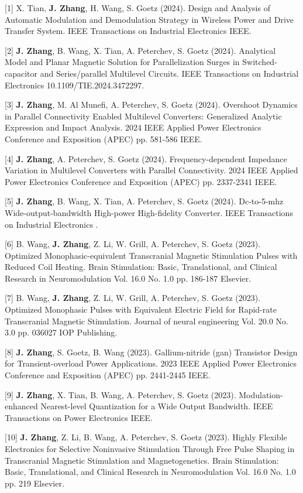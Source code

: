 [1] X. Tian, \textbf{J. Zhang}, H. Wang, S. Goetz (2024). Design and Analysis of Automatic Modulation and Demodulation Strategy in Wireless Power and Drive Transfer System. IEEE Transactions on Industrial Electronics    IEEE.

[2] \textbf{J. Zhang}, B. Wang, X. Tian, A. Peterchev, S. Goetz (2024). Analytical Model and Planar Magnetic Solution for Parallelization Surges in Switched-capacitor and Series/parallel Multilevel Circuits. IEEE Transactions on Industrial Electronics    10.1109/TIE.2024.3472297.

[3] \textbf{J. Zhang}, M. Al Munefi, A. Peterchev, S. Goetz (2024). Overshoot Dynamics in Parallel Connectivity Enabled Multilevel Converters: Generalized Analytic Expression and Impact Analysis. 2024 IEEE Applied Power Electronics Conference and Exposition (APEC)   pp. 581-586 IEEE.

[4] \textbf{J. Zhang}, A. Peterchev, S. Goetz (2024). Frequency-dependent Impedance Variation in Multilevel Converters with Parallel Connectivity. 2024 IEEE Applied Power Electronics Conference and Exposition (APEC)   pp. 2337-2341 IEEE.

[5] \textbf{J. Zhang}, B. Wang, X. Tian, A. Peterchev, S. Goetz (2024). Dc-to-5-mhz Wide-output-bandwidth High-power High-fidelity Converter. IEEE Transactions on Industrial Electronics    .

[6] B. Wang, \textbf{J. Zhang}, Z. Li, W. Grill, A. Peterchev, S. Goetz (2023). Optimized Monophasic-equivalent Transcranial Magnetic Stimulation Pulses with Reduced Coil Heating. Brain Stimulation: Basic, Translational, and Clinical Research in Neuromodulation Vol. 16.0 No. 1.0 pp. 186-187 Elsevier.

[7] B. Wang, \textbf{J. Zhang}, Z. Li, W. Grill, A. Peterchev, S. Goetz (2023). Optimized Monophasic Pulses with Equivalent Electric Field for Rapid-rate Transcranial Magnetic Stimulation. Journal of neural engineering Vol. 20.0 No. 3.0 pp. 036027 IOP Publishing.

[8] \textbf{J. Zhang}, S. Goetz, B. Wang (2023). Gallium-nitride (gan) Transistor Design for Transient-overload Power Applications. 2023 IEEE Applied Power Electronics Conference and Exposition (APEC)   pp. 2441-2445 IEEE.

[9] \textbf{J. Zhang}, X. Tian, B. Wang, A. Peterchev, S. Goetz (2023). Modulation-enhanced Nearest-level Quantization for a Wide Output Bandwidth. IEEE Transactions on Power Electronics    IEEE.

[10] \textbf{J. Zhang}, Z. Li, B. Wang, A. Peterchev, S. Goetz (2023). Highly Flexible Electronics for Selective Noninvasive Stimulation Through Free Pulse Shaping in Transcranial Magnetic Stimulation and Magnetogenetics. Brain Stimulation: Basic, Translational, and Clinical Research in Neuromodulation Vol. 16.0 No. 1.0 pp. 219 Elsevier.

